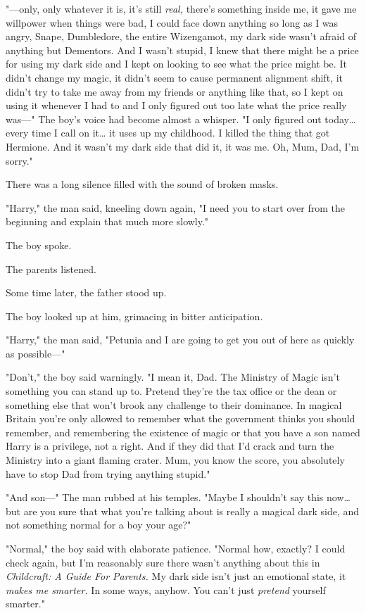 "---only, only whatever it is, it's still \emph{real,} there's something inside 
me, it gave me willpower when things were bad, I could face down anything so 
long as I was angry, Snape, Dumbledore, the entire Wizengamot, my dark side 
wasn't afraid of anything but Dementors. And I wasn't stupid, I knew that there 
might be a price for using my dark side and I kept on looking to see what the 
price might be. It didn't change my magic, it didn't seem to cause permanent 
alignment shift, it didn't try to take me away from my friends or anything like 
that, so I kept on using it whenever I had to and I only figured out too late 
what the price really was---" The boy's voice had become almost a whisper. "I 
only figured out today{\ldots} every time I call on it{\ldots} it uses up my 
childhood. I killed the thing that got Hermione. And it wasn't my dark side 
that did it, it was me. Oh, Mum, Dad, I'm sorry."

There was a long silence filled with the sound of broken masks.

"Harry," the man said, kneeling down again, "I need you to start over from the 
beginning and explain that much more slowly."

The boy spoke.

The parents listened.

Some time later, the father stood up.

The boy looked up at him, grimacing in bitter anticipation.

"Harry," the man said, "Petunia and I are going to get you out of here as 
quickly as possible---"

"Don't," the boy said warningly. "I mean it, Dad. The Ministry of Magic isn't 
something you can stand up to. Pretend they're the tax office or the dean or 
something else that won't brook any challenge to their dominance. In magical 
Britain you're only allowed to remember what the government thinks you should 
remember, and remembering the existence of magic or that you have a son named 
Harry is a privilege, not a right. And if they did that I'd crack and turn the 
Ministry into a giant flaming crater. Mum, you know the score, you absolutely 
have to stop Dad from trying anything stupid."

"And son---" The man rubbed at his temples. "Maybe I shouldn't say this 
now{\ldots} but are you sure that what you're talking about is really a magical 
dark side, and not something normal for a boy your age?"

"Normal," the boy said with elaborate patience. "Normal how, exactly? I could 
check again, but I'm reasonably sure there wasn't anything about this in 
\emph{Childcraft: A Guide For Parents.} My dark side isn't just an emotional 
state, it \emph{makes me smarter.} In some ways, anyhow. You can't just 
\emph{pretend} yourself smarter."

